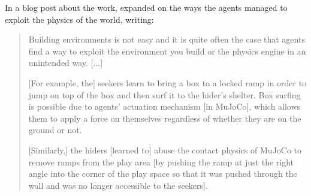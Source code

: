 In a blog post about the work, \citet{baker2019emergent} expanded on the ways the agents managed to exploit the physics of the world, writing:

\begin{quote}

Building environments is not easy and it is quite often the case that agents find a way to exploit the environment you build or the physics engine in an unintended way. [...]

[For example, the] seekers learn to bring a box to a locked ramp in order to jump on top of the box and then surf it to the hider's shelter. 
Box surfing is possible due to agents' actuation mechanism [in MuJoCo], which allows them to apply a force on themselves regardless of whether they are on the ground or not. 

[Similarly,] the hiders [learned to] abuse the contact physics of MuJoCo to remove ramps from the play area [by pushing the ramp at just the right angle into the corner of the play space so that it was pushed through the wall and was no longer accessible to the seekers].

\end{quote}
